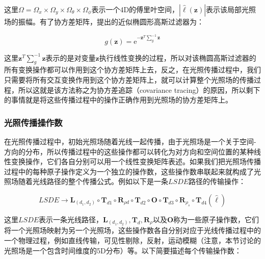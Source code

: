 \noindent 这里$\Omega=\Omega_x\times\Omega_y\times\Omega_\theta\times\Omega_\phi$表示一个4D的傅里叶空间，$|\hat{\ell}(\mathbf{z})|$表示该局部光照场的振幅。有了协方差矩阵，\cite{a:5DCovarianceTracingforEfficientDefocusandMotionBlur}提出的近似椭圆形高斯过滤器为：

\begin{equation}
	g(\mathbf{z})=\mathrm{e}^{-\mathbf{z}^{T}\sum^{-1}_g \mathbf{z}}
\end{equation}

\noindent 这里$\mathbf{z}^{T}\sum^{-1}_g \mathbf{z}$表示的是对变量$\mathbf{z}$执行线性变换的过程，所以对该椭圆高斯过滤器的所有变换操作都可以作用到这个协方差矩阵上去，反之，在光照传播过程中，我们只需要将所有交互变换作用到这个协方差矩阵上，就可以计算整个光照场的传播过程，所以这就是该方法称之为协方差追踪（covariance tracing）的原因，所以剩下的事情就是将这些传播过程中的操作正确作用到光照场的协方差矩阵上。





\subsubsection{光照传播操作数}
在光照传播过程中，初始光照场随着光线一起传播，由于光照场是一个关于空间-方向的分布，所以传播过程中的这些操作都可以转化为对方向和空间位置的某种线性变换操作，它们各自分别可以用一个线性变换矩阵表述。如果我们把光照场传播过程中的每种原子操作定义为一个独立的操作数，这些操作数串联起来就构成了光照场随着光线路径的整个传播公式。例如以下是一条$LSDE$路径的传输操作：

\begin{equation}
	LSDE\to\mathbf{L}_(d_1,d_2)\circ\mathbf{T}_{d1}\circ\mathbf{R}_{\rho d}\circ\mathbf{T}_{d2}\circ\mathbf{O}\circ\mathbf{T}_{d3}\circ\mathbf{R}_{\rho_s}\circ\mathbf{T}_{d4}(\hat{\ell})
\end{equation}

\noindent 这里$LSDE$表示一条光线路径，$\mathbf{L}_(d_1,d_2), \mathbf{T}_d, \mathbf{R}_\rho$以及$\mathbf{O}$称为一些原子操作数，它们将一个光照场映射为另一个光照场，这些操作数各自分别对应于光线传播过程中的一个物理过程，例如直线传输，可见性剔除，反射，运动模糊（注意，本节讨论的光照场是一个包含时间维度的5D分布）等。以下简要描述每个传输操作数：

